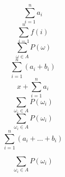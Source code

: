 \[
\sum_{i=1}^{n} a_i
\]
\[
\sum_{i=1}^{n} f(i)
\]
\[
\sum_{\omega\in A} P(\omega)
\]
\[
\sum_{i=1}^{n} (a_i+b_i)
\]
\[
x+\sum_{i=1}^{n} a_i
\]
\[
\sum_{\omega_i\in A}P(\omega_i)
\]
\[
\sum_{\omega_i \in A} P(\omega_i)
\]
\[
\sum_{i=1}^{n} (a_i+\dots+b_i)
\]

\[
\sum_{\omega_i\in A} P(\omega_i)
\]

